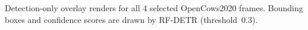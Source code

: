 \caption{Detection-only overlay renders for all 4 selected OpenCows2020 frames. Bounding boxes and confidence scores are drawn by RF-DETR (threshold~0.3).}\label{fig:detection-gallery-opencows2020}
